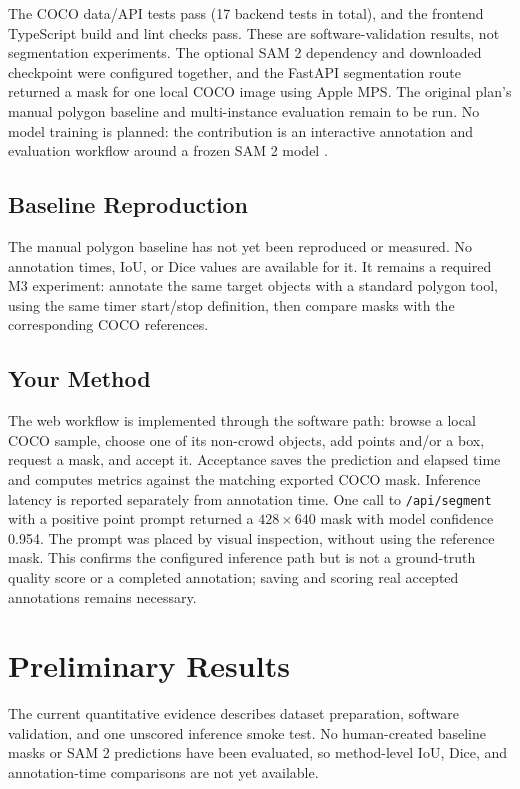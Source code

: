\documentclass[11pt]{article}
\begin{document}
The COCO data/API tests pass (17 backend tests in total), and the frontend
TypeScript build and lint checks pass. These are software-validation results,
not segmentation experiments. The optional SAM 2 dependency and downloaded
checkpoint were configured together, and the FastAPI segmentation route
returned a mask for one local COCO image using Apple MPS. The original plan's
manual polygon baseline and multi-instance evaluation remain to be run. No
model training is planned: the contribution is an interactive annotation and
evaluation workflow around a frozen SAM 2 model \citep{ravi2024sam2}.

\subsection{Baseline Reproduction}
The manual polygon baseline has not yet been reproduced or measured. No
annotation times, IoU, or Dice values are available for it. It remains a
required M3 experiment: annotate the same target objects with a standard
polygon tool, using the same timer start/stop definition, then compare masks
with the corresponding COCO references.

\subsection{Your Method}
The web workflow is implemented through the software path: browse a local COCO
sample, choose one of its non-crowd objects, add points and/or a box, request a
mask, and accept it. Acceptance saves the prediction and elapsed time and
computes metrics against the matching exported COCO mask. Inference latency is
reported separately from annotation time. One call to \texttt{/api/segment}
with a positive point prompt returned a $428 \times 640$ mask with model
confidence 0.954. The prompt was placed by visual inspection, without using the
reference mask. This confirms the configured inference path but is not a
ground-truth quality score or a completed annotation; saving and scoring real
accepted annotations remains necessary.

\section{Preliminary Results}
\label{sec:results}
The current quantitative evidence describes dataset preparation, software
validation, and one unscored inference smoke test. No human-created baseline
masks or SAM 2 predictions have been evaluated, so method-level IoU, Dice, and
annotation-time comparisons are not yet available.
\end{document}
